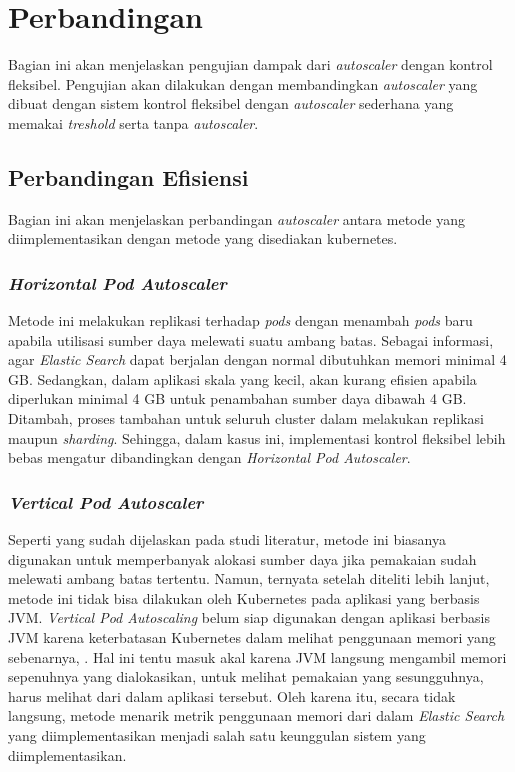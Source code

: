 \section{Perbandingan}

Bagian ini akan menjelaskan pengujian dampak dari \textit{autoscaler} dengan kontrol fleksibel. Pengujian akan dilakukan dengan membandingkan \textit{autoscaler} yang dibuat dengan sistem kontrol fleksibel dengan \textit{autoscaler} sederhana yang memakai \textit{treshold} serta tanpa \textit{autoscaler}. 


\subsection{Perbandingan Efisiensi}

Bagian ini akan menjelaskan perbandingan \textit{autoscaler} antara metode yang diimplementasikan dengan metode yang disediakan kubernetes.

\subsubsection{\textit{Horizontal Pod Autoscaler}}

Metode ini melakukan replikasi terhadap \textit{pods} dengan menambah \textit{pods} baru apabila utilisasi sumber daya melewati suatu ambang batas. Sebagai informasi, agar \textit{Elastic Search} dapat berjalan dengan normal dibutuhkan memori minimal 4 GB. Sedangkan, dalam aplikasi skala yang kecil, akan kurang efisien apabila diperlukan minimal 4 GB untuk penambahan sumber daya dibawah 4 GB. Ditambah, proses tambahan untuk seluruh cluster dalam melakukan replikasi maupun \textit{sharding}. Sehingga, dalam kasus ini, implementasi kontrol fleksibel lebih bebas mengatur dibandingkan dengan \textit{Horizontal Pod Autoscaler}.

\subsubsection{\textit{Vertical Pod Autoscaler}}

Seperti yang sudah dijelaskan pada studi literatur, metode ini biasanya digunakan untuk memperbanyak alokasi sumber daya jika pemakaian sudah melewati ambang batas tertentu. Namun, ternyata setelah diteliti lebih lanjut, metode ini tidak bisa dilakukan oleh Kubernetes pada aplikasi yang berbasis JVM. \textit{Vertical Pod Autoscaling} belum siap digunakan dengan aplikasi berbasis JVM karena keterbatasan Kubernetes dalam melihat penggunaan memori yang sebenarnya, \parencite{googlevpajvm}. Hal ini tentu masuk akal karena JVM langsung mengambil memori sepenuhnya yang dialokasikan, untuk melihat pemakaian yang sesungguhnya, harus melihat dari dalam aplikasi tersebut. Oleh karena itu, secara tidak langsung, metode menarik metrik penggunaan memori dari dalam \textit{Elastic Search} yang diimplementasikan menjadi salah satu keunggulan sistem yang diimplementasikan.